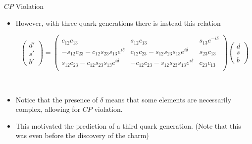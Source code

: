 \documentclass{beamer}
\begin{document}
\begin{frame}{$CP$ Violation}
  \begin{itemize}
    \item However, with three quark generations there is instead this relation
      \begin{center}
      {\tiny
      \begin{equation*}
        \begin{pmatrix} d' \\ s' \\ b' \end{pmatrix} =
        \begin{pmatrix}
          c_{12}c_{13}                                  & s_{12}c_{13}                               & s_{13}e^{-i\delta} \\
          -s_{12}c_{23}-c_{12}s_{23}s_{13}e^{i\delta}   & c_{12}c_{23} - s_{12}s_{23}s_{13}e^{i\delta} & s_{23}c_{13} \\
          s_{12}c_{23}-c_{12}s_{23}s_{13}e^{i\delta}    & -c_{12}c_{23} - s_{12}s_{23}s_{13}e^{i\delta} & c_{23}c_{13} \\
        \end{pmatrix}
        \begin{pmatrix} d \\ s \\ b \end{pmatrix}
      \end{equation*}
      }
      \end{center}
      \pause\
    \item Notice that the presence of $\delta$ means that some elements are necessarily complex, allowing for $CP$ violation.
    \pause\
    \item This motivated the prediction of a third quark generation. (Note that this was even before the discovery of the charm)
  \end{itemize}
\end{frame}
\end{document}
